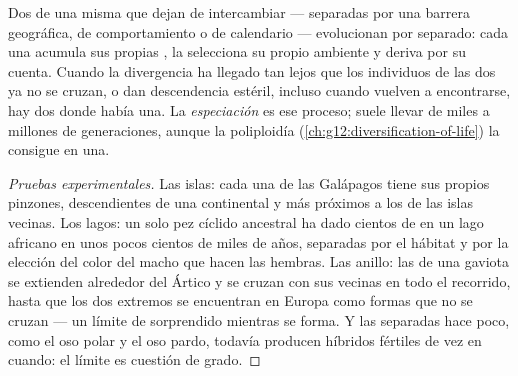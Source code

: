 \begin{proposition}[La especiación]\label{prop:g12:selection-drift-speciation:speciation}
Dos  de una misma  que dejan de intercambiar 
--- separadas por una barrera geográfica, de comportamiento o de
calendario --- evolucionan por separado: cada una acumula sus propias
, la selecciona su propio ambiente y deriva por su cuenta.
Cuando la divergencia ha llegado tan lejos que los individuos de las
dos  ya no se cruzan, o dan descendencia estéril, incluso
cuando vuelven a encontrarse, hay dos  donde había una. La
\emph{especiación} es ese proceso; suele llevar de
miles a millones de generaciones, aunque la poliploidía
(\cref{ch:g12:diversification-of-life}) la consigue en una.
\end{proposition}
\begin{proof}[Pruebas experimentales]
Las islas: cada una de las Galápagos tiene sus propios pinzones,
descendientes de una  continental y más próximos a los de las
islas vecinas. Los lagos: un solo pez cíclido ancestral ha dado
cientos de  en un lago africano en unos pocos cientos de miles
de años, separadas por el hábitat y por la elección del color del macho
que hacen las hembras. Las  anillo: las  de una
gaviota se extienden alrededor del Ártico y se cruzan con sus vecinas
en todo el recorrido, hasta que los dos extremos se encuentran en
Europa como formas que no se cruzan --- un límite de 
sorprendido mientras se forma. Y las  separadas hace poco, como
el oso polar y el oso pardo, todavía producen híbridos fértiles de vez
en cuando: el límite es cuestión de grado.
\end{proof}

